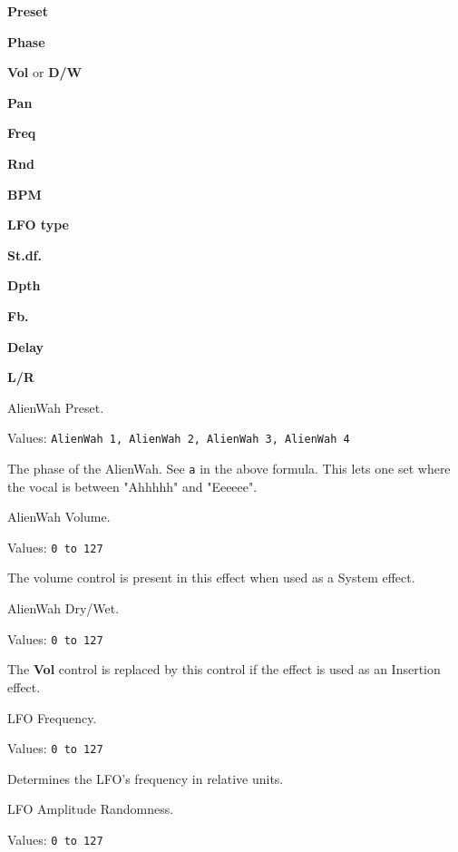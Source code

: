    \begin{enumber}
      \item \textbf{Preset}
      \item \textbf{Phase}
      \item \textbf{Vol} or \textbf{D/W}
      \item \textbf{Pan}
      \item \textbf{Freq}
      \item \textbf{Rnd}
      \item \textbf{BPM}
      \item \textbf{LFO type}
      \item \textbf{St.df.}
      \item \textbf{Dpth}
      \item \textbf{Fb.}
      \item \textbf{Delay}
      \item \textbf{L/R}
   \end{enumber}

   \setcounter{ItemCounter}{0}      %

   AlienWah Preset.

   Values: \texttt{AlienWah 1, AlienWah 2, AlienWah 3, AlienWah 4}

   The phase of the AlienWah.
   See \texttt{a} in the above formula.
   This lets one set where the vocal is between
   "Ahhhhh" and "Eeeeee".

   AlienWah Volume.

   Values: \texttt{0 to 127}

   The volume control is present in this effect when used as a System
   effect.

   AlienWah Dry/Wet.

   Values: \texttt{0 to 127}

   The \textbf{Vol} control is replaced by this control if the effect is
   used as an Insertion effect.

   LFO Frequency.

   Values: \texttt{0 to 127}

   Determines the LFO’s frequency in relative units.

   LFO Amplitude Randomness.

   Values: \texttt{0 to 127}

